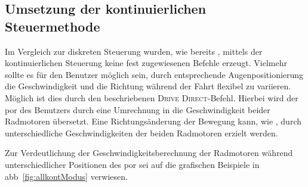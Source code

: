 \subsection{Umsetzung der kontinuierlichen Steuermethode}
\label{subsection:kontSt}
Im Vergleich zur diskreten Steuerung wurden, wie bereits \og, mittels der kontinuierlichen Steuerung keine fest zugewiesenen Befehle erzeugt. Vielmehr sollte es für den Benutzer möglich sein, durch entsprechende Augenpositionierung die Geschwindigkeit und die Richtung während der Fahrt flexibel zu variieren. Möglich ist dies durch den beschriebenen \textsc{Drive} \textsc{Direct}-Befehl. Hierbei wird der \acs{por} des Benutzers durch eine Umrechnung in die Geschwindigkeit beider Radmotoren übersetzt. Eine Richtungsänderung der Bewegung kann, wie \og, durch unterschiedliche Geschwindigkeiten der beiden Radmotoren erzielt werden.

Zur Verdeutlichung der Geschwindigkeitsberechnung der Radmotoren während unterschiedlicher Positionen des \acs{por} sei auf die grafischen Beispiele in \acs{abb}~\ref{fig:allkontModus} verwiesen.

